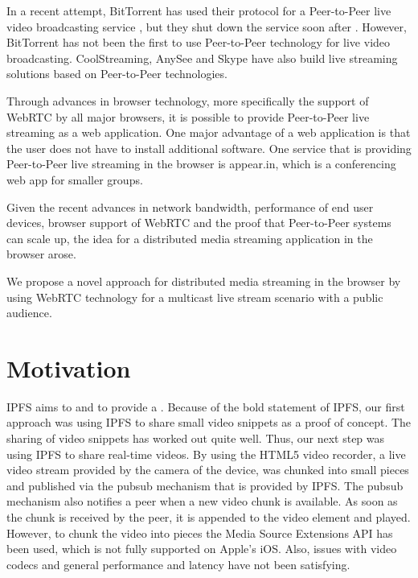 In a recent attempt, BitTorrent has used their protocol for a Peer-to-Peer live video broadcasting service \cite{bittorrent-live}, but they shut down the service soon after \cite{bittorrent-live-shutdown}. However, BitTorrent has not been the first to use Peer-to-Peer technology for live video broadcasting. CoolStreaming, AnySee and Skype have also build live streaming solutions based on Peer-to-Peer technologies.

Through advances in browser technology, more specifically the support of WebRTC by all major browsers, it is possible to provide Peer-to-Peer live streaming as a web application. One major advantage of a web application is that the user does not have to install additional software. 
One service that is providing Peer-to-Peer live streaming in the browser is appear.in, which is a conferencing web app for smaller groups.

Given the recent advances in network bandwidth, performance of end user devices, browser support of WebRTC and the proof that Peer-to-Peer systems can scale up, the idea for a distributed media streaming application in the browser arose.

We propose a novel approach for distributed media streaming in the browser by using WebRTC technology for a multicast live stream scenario with a public audience.

\section{Motivation}
IPFS aims to  and to provide a  \cite{ipfs-website}.
Because of the bold statement of IPFS, our first approach was using IPFS to share small video snippets as a proof of concept. The sharing of video snippets has worked out quite well. Thus, our next step was using IPFS to share real-time videos. By using the HTML5 video recorder, a live video stream provided by the camera of the device, was chunked into small pieces and published via the \gls{pubsub} mechanism that is provided by IPFS. The \gls{pubsub} mechanism also notifies a peer when a new video chunk is available. As soon as the chunk is received by the peer, it is appended to the video element and played. However, to chunk the video into pieces the Media Source Extensions API has been used, which is not fully supported on Apple's iOS. Also, issues with video codecs and general performance and latency have not been satisfying.

